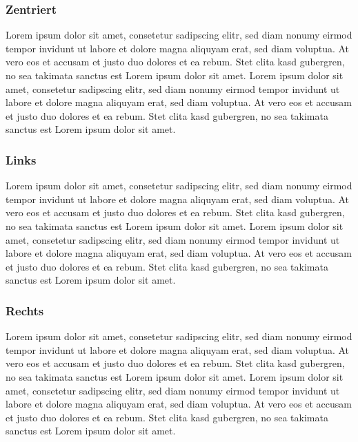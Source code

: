 \documentclass[a4paper,12pt]{article}
\begin{document}
	\subsubsection{Zentriert}
		\begin{center}
			Lorem ipsum dolor sit amet, consetetur sadipscing elitr, sed diam nonumy eirmod tempor invidunt ut labore et dolore magna
			aliquyam erat, sed diam voluptua. At vero eos et accusam et justo duo dolores et ea rebum. Stet clita kasd gubergren, 
			no sea takimata sanctus est Lorem ipsum dolor sit amet. Lorem ipsum dolor sit amet, consetetur sadipscing elitr, 
			sed diam nonumy eirmod tempor invidunt ut labore et dolore magna aliquyam erat, sed diam voluptua. 
			At vero eos et accusam et justo duo dolores et ea rebum. Stet clita kasd gubergren, no sea takimata sanctus est 
			Lorem ipsum dolor sit amet.
		\end{center}
	\subsubsection{Links}
		\begin{flushleft}
			Lorem ipsum dolor sit amet, consetetur sadipscing elitr, sed diam nonumy eirmod tempor invidunt ut labore et dolore magna
			aliquyam erat, sed diam voluptua. At vero eos et accusam et justo duo dolores et ea rebum. Stet clita kasd gubergren, 
			no sea takimata sanctus est Lorem ipsum dolor sit amet. Lorem ipsum dolor sit amet, consetetur sadipscing elitr, 
			sed diam nonumy eirmod tempor invidunt ut labore et dolore magna aliquyam erat, sed diam voluptua. 
			At vero eos et accusam et justo duo dolores et ea rebum. Stet clita kasd gubergren, no sea takimata sanctus est 
			Lorem ipsum dolor sit amet.
		\end{flushleft}
	\subsubsection{Rechts}
		\begin{flushright}
			Lorem ipsum dolor sit amet, consetetur sadipscing elitr, sed diam nonumy eirmod tempor invidunt ut labore et dolore magna
			aliquyam erat, sed diam voluptua. At vero eos et accusam et justo duo dolores et ea rebum. Stet clita kasd gubergren, 
			no sea takimata sanctus est Lorem ipsum dolor sit amet. Lorem ipsum dolor sit amet, consetetur sadipscing elitr, 
			sed diam nonumy eirmod tempor invidunt ut labore et dolore magna aliquyam erat, sed diam voluptua. 
			At vero eos et accusam et justo duo dolores et ea rebum. Stet clita kasd gubergren, no sea takimata sanctus est 
			Lorem ipsum dolor sit amet.		
		\end{flushright}
\end{document}
